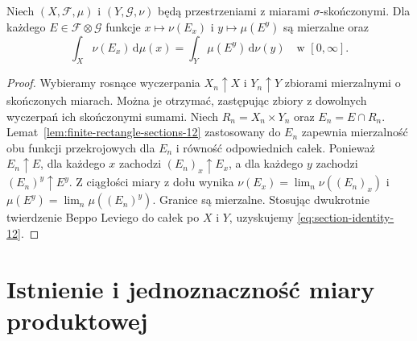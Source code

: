 \begin{twierdzenie}
\label{thm:section-identity-12}
Niech $(X,\mathcal F,\mu)$ i $(Y,\mathcal G,\nu)$
będą przestrzeniami z miarami $\sigma$-skończonymi.
Dla każdego $E\in\mathcal F\otimes\mathcal G$
funkcje $x\mapsto\nu(E_x)$ i $y\mapsto\mu(E^y)$
są mierzalne oraz
\begin{equation}\label{eq:section-identity-12}
\int_X\nu(E_x)\,\mathrm d\mu(x)
=\int_Y\mu(E^y)\,\mathrm d\nu(y)
\quad\text{w }[0,\infty].
\end{equation}
\end{twierdzenie}
\begin{proof}
Wybieramy rosnące wyczerpania
$X_n\uparrow X$ i $Y_n\uparrow Y$ zbiorami mierzalnymi
o skończonych miarach. Można je otrzymać, zastępując
zbiory z dowolnych wyczerpań ich skończonymi sumami.
Niech $R_n=X_n\times Y_n$ oraz $E_n=E\cap R_n$.
Lemat~\ref{lem:finite-rectangle-sections-12}
zastosowany do $E_n$ zapewnia mierzalność obu
funkcji przekrojowych dla $E_n$ i równość odpowiednich
całek. Ponieważ $E_n\uparrow E$, dla każdego $x$
zachodzi $(E_n)_x\uparrow E_x$, a dla każdego $y$
zachodzi $(E_n)^y\uparrow E^y$. Z ciągłości miary
z dołu wynika
$\nu(E_x)=\lim_n\nu((E_n)_x)$ i
$\mu(E^y)=\lim_n\mu((E_n)^y)$. Granice są
mierzalne. Stosując dwukrotnie twierdzenie
Beppo Leviego do całek po $X$ i $Y$, uzyskujemy
\eqref{eq:section-identity-12}.
\end{proof}

\section{Istnienie i jednoznaczność miary produktowej}


